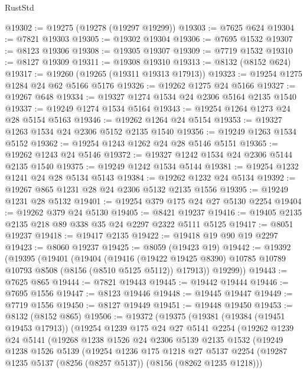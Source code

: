 \begin{lexlean}{RustStd}
\begin{coremodule}
{\begin{coremodule}
{{{{{{{{{{{{{{{{{{{{{{{{{{{{{{{{{{@19302 := @19275 (@19278 (@19297 @19299))
@19303 := @7625 @624
@19304 := @7821 @19303
@19305 := @19302 @19304
@19306 := @7695 @1532
@19307 := @8123 @19306
@19308 := @19305 @19307
@19309 := @7719 @1532
@19310 := @8127 @19309
@19311 := @19308 @19310
@19313 := @8132 (@8152 @624)
@19317 := @19260 (@19265 (@19311 @19313 @17913))
@19323 := @19254 @1275 @1284 @24 @62 @5166 @5176
@19326 := @19262 @1275 @24 @5166
@19327 := @19267 @648
@19334 := @19327 @1274 @1534 @24 @2306 @5164 @2135 @1540
@19337 := @19249 @1274 @1534 @5164
@19343 := @19254 @1264 @1273 @24 @28 @5154 @5163
@19346 := @19262 @1264 @24 @5154
@19353 := @19327 @1263 @1534 @24 @2306 @5152 @2135 @1540
@19356 := @19249 @1263 @1534 @5152
@19362 := @19254 @1243 @1262 @24 @28 @5146 @5151
@19365 := @19262 @1243 @24 @5146
@19372 := @19327 @1242 @1534 @24 @2306 @5144 @2135 @1540
@19375 := @19249 @1242 @1534 @5144
@19381 := @19254 @1232 @1241 @24 @28 @5134 @5143
@19384 := @19262 @1232 @24 @5134
@19392 := @19267 @865 @1231 @28 @24 @2306 @5132 @2135 @1556
@19395 := @19249 @1231 @28 @5132
@19401 := @19254 @379 @175 @24 @27 @5130 @2254
@19404 := @19262 @379 @24 @5130
@19405 := @8421 @19237
@19416 := @19405 @2135 @2135 @218 @89 @338 @35 @24 @2297 @2322 @5111 @5125
@19417 := @8051 @19237
@19418 := @19417 @2135
@19422 := @19418 @19 @90 @19 @2297
@19423 := @8060 @19237
@19425 := @8059 (@19423 @19)
@19442 := @19392
    (@19395
      (@19401
        (@19404
          (@19416
            (@19422 @19425 @8390)
            @10785
            @10789
            @10793
            @8508
            (@8156 (@8510 @5125 @5112))
            @17913))
        @19299))
@19443 := @7625 @865
@19444 := @7821 @19443
@19445 := @19442 @19444
@19446 := @7695 @1556
@19447 := @8123 @19446
@19448 := @19445 @19447
@19449 := @7719 @1556
@19450 := @8127 @19449
@19451 := @19448 @19450
@19453 := @8132 (@8152 @865)
@19506 := @19372
    (@19375
      (@19381
        (@19384 (@19451 @19453 @17913))
        (@19254
          @1239
          @175
          @24
          @27
          @5141
          @2254
          (@19262
            @1239
            @24
            @5141
            (@19268
              @1238
              @1526
              @24
              @2306
              @5139
              @2135
              @1532
              (@19249
                @1238
                @1526
                @5139
                (@19254
                  @1236
                  @175
                  @1218
                  @27
                  @5137
                  @2254
                  (@19287 @1235 @5137 (@8256 (@8257 @5137)) (@8156 (@8262 @1235 @1218)))
}}}}}}}}}}}}}}}}}}}}}}}}}}}}}}}}}}
\end{coremodule}}
\end{coremodule}
\end{lexlean}
